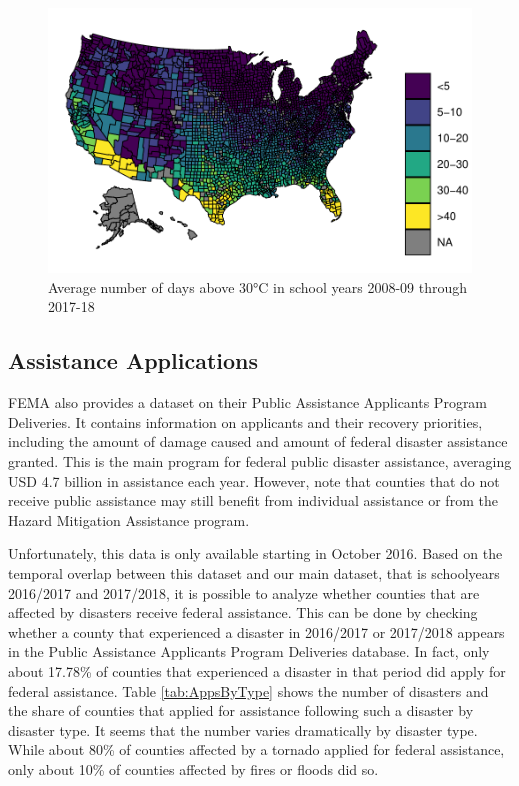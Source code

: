 \begin{figure}[!h]
	\centering
	\includegraphics[scale=1]{"../Code & Data/HeatMapDays.pdf"}
	\caption{Average number of days above 30°C in school years 2008-09 through 2017-18}
	\label{HeatMapDays}
\end{figure}


\subsection{Assistance Applications}

FEMA also provides a dataset on  their Public Assistance Applicants Program Deliveries. It contains information on applicants and their recovery priorities, including the amount of damage caused and amount of federal disaster assistance granted. This is the main program for federal public disaster assistance, averaging USD 4.7 billion in assistance each year. However, note that counties that do not receive public assistance may still benefit from individual assistance or from the Hazard Mitigation Assistance program.

Unfortunately, this data is only available starting in October 2016. Based on the temporal overlap between this dataset and our main dataset, that is schoolyears 2016/2017 and 2017/2018, it is possible to analyze whether counties that are affected by disasters receive federal assistance. This can be done by checking whether a county that experienced a disaster in 2016/2017 or 2017/2018 appears in the Public Assistance Applicants Program Deliveries database. In fact, only about 17.78\% of counties that experienced a disaster in that period did apply for federal assistance. Table \ref{tab:AppsByType} shows the number of disasters and the share of counties that applied for assistance following such a disaster by disaster type. It seems that the number varies dramatically by disaster type. While about 80\% of counties affected by a tornado applied for federal assistance, only about 10\% of counties affected by fires or floods did so.

